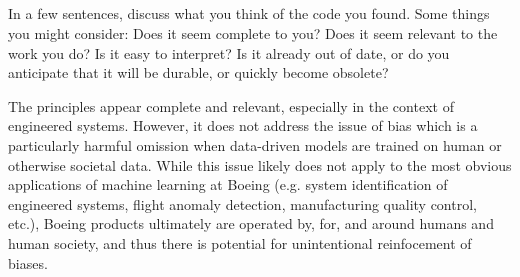 \documentclass[11pt]{article}
\begin{document}
\subsection{} %
In a few sentences, discuss what you think of the code you found. Some things you might
consider: Does it seem complete to you? Does it seem relevant to the work you do? Is it easy
to interpret? Is it already out of date, or do you anticipate that it will be durable, or quickly
become obsolete?

The principles appear complete and relevant, especially in the context of
engineered systems. However, it does not address the issue of bias which is a
particularly harmful omission when data-driven models are trained on human or
otherwise societal data. While this issue likely does not apply to the most
obvious applications of machine learning at Boeing (e.g. system identification
of engineered systems, flight anomaly detection, manufacturing quality control,
etc.), Boeing products ultimately are operated by, for, and around humans and
human society, and thus there is potential for unintentional reinfocement of
biases.
\end{document}

